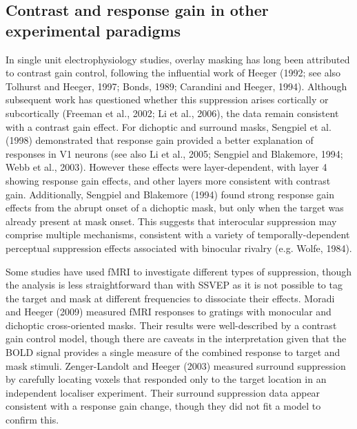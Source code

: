 \documentclass[]{article}
\begin{document}
\hypertarget{contrast-and-response-gain-in-other-experimental-paradigms}{%
\subsection{Contrast and response gain in other experimental paradigms}\label{contrast-and-response-gain-in-other-experimental-paradigms}}

In single unit electrophysiology studies, overlay masking has long been attributed to contrast gain control, following the influential work of Heeger (1992; see also Tolhurst and Heeger, 1997; Bonds, 1989; Carandini and Heeger, 1994). Although subsequent work has questioned whether this suppression arises cortically or subcortically (Freeman et al., 2002; Li et al., 2006), the data remain consistent with a contrast gain effect. For dichoptic and surround masks, Sengpiel et al. (1998) demonstrated that response gain provided a better explanation of responses in V1 neurons (see also Li et al., 2005; Sengpiel and Blakemore, 1994; Webb et al., 2003). However these effects were layer-dependent, with layer 4 showing response gain effects, and other layers more consistent with contrast gain. Additionally, Sengpiel and Blakemore (1994) found strong response gain effects from the abrupt onset of a dichoptic mask, but only when the target was already present at mask onset. This suggests that interocular suppression may comprise multiple mechanisms, consistent with a variety of temporally-dependent perceptual suppression effects associated with binocular rivalry (e.g. Wolfe, 1984).

Some studies have used fMRI to investigate different types of suppression, though the analysis is less straightforward than with SSVEP as it is not possible to tag the target and mask at different frequencies to dissociate their effects. Moradi and Heeger (2009) measured fMRI responses to gratings with monocular and dichoptic cross-oriented masks. Their results were well-described by a contrast gain control model, though there are caveats in the interpretation given that the BOLD signal provides a single measure of the combined response to target and mask stimuli. Zenger-Landolt and Heeger (2003) measured surround suppression by carefully locating voxels that responded only to the target location in an independent localiser experiment. Their surround suppression data appear consistent with a response gain change, though they did not fit a model to confirm this.
\end{document}
